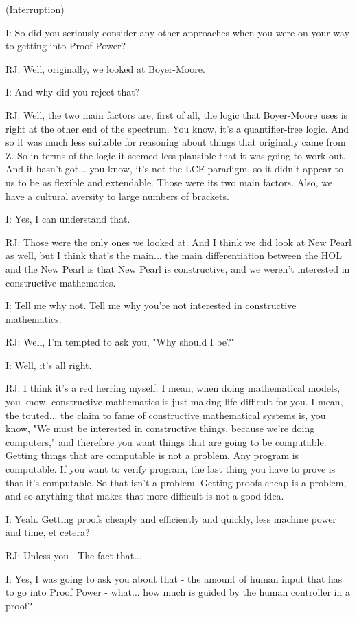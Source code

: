 \documentclass[10pt,titlepage]{book}
\begin{document}
(Interruption)

I: So did you seriously consider any other approaches when you were on your way to getting into Proof Power?

RJ: Well, originally, we looked at Boyer-Moore.

I: And why did you reject that?

RJ: Well, the two main factors are, first of all, the logic that Boyer-Moore uses is right at the other end of the spectrum. You know, it's a quantifier-free 	logic. And so it was much less suitable for reasoning about things that originally came from Z. So in terms of the logic it seemed less plausible that it was going to work out. And it hasn't got... you know, it's not the LCF paradigm, so it didn't appear to us to be as flexible and extendable. Those were its two main factors. Also, we have a cultural aversity to large numbers of brackets.

I: Yes, I can understand that.

RJ: Those were the only ones we looked at. And I think we did look at New Pearl as well, but I think that's the main... the main differentiation between the HOL and the New Pearl is that New Pearl is constructive, and we weren't interested in constructive mathematics.

I: Tell me why not. Tell me why you're not interested in constructive mathematics.

RJ: Well, I'm tempted to ask you, "Why should I be?"

I: Well, it's all right.

RJ: I think it's a red herring myself. I mean, when doing mathematical models, you know, constructive mathematics is just making life difficult for you. I mean, the touted... the claim to fame of constructive mathematical systems is, you know, "We must be interested in constructive things, because we're doing computers," and therefore you want things that are going to be computable. Getting things that are computable is not a problem. Any program is computable. If you want to verify program, the last thing you have to prove is that it's computable. So that isn't a problem. Getting proofs cheap is a problem, and so anything that makes that more difficult is not a good idea.

I: Yeah. Getting proofs cheaply and efficiently and quickly, less machine power and time, et cetera?

RJ: Unless you	. The fact that...

I: Yes, I was going to ask you about that - the amount of human input that has to go into Proof Power - what... how much is guided by the human controller in a proof?
\end{document}
